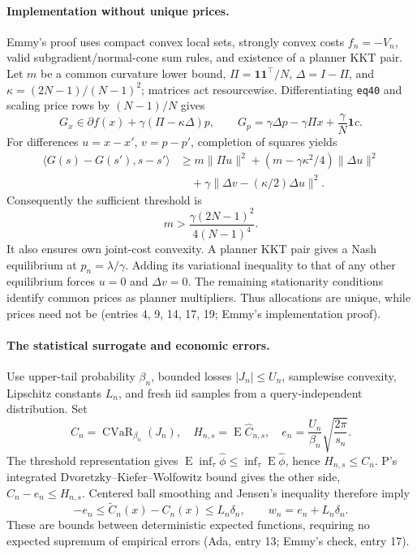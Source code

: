 \documentclass{article}
\begin{document}
\paragraph{Implementation without unique prices.}
Emmy's proof uses compact convex local sets, strongly convex costs
\(f_n=-V_n\), valid subgradient/normal-cone sum rules, and existence of a
planner KKT pair. Let \(m\) be a common curvature lower bound,
\(\Pi=\mathbf1\mathbf1^\top/N\), \(\Delta=I-\Pi\), and
\(\kappa=(2N-1)/(N-1)^2\); matrices act resourcewise.
Differentiating \texttt{eq40} and scaling price rows by \((N-1)/N\) gives
\[
 G_x\in\partial f(x)+\gamma(\Pi-\kappa\Delta)p,
 \qquad G_p=\gamma\Delta p-\gamma\Pi x+\frac{\gamma}{N}\mathbf1c.
\]
For differences \(u=x-x'\), \(v=p-p'\), completion of squares yields
\begin{align*}
 \langle G(s)-G(s'),s-s'\rangle
 &\ge m\|\Pi u\|^2
 +(m-\gamma\kappa^2/4)\|\Delta u\|^2\\
 &\quad+\gamma\|\Delta v-(\kappa/2)\Delta u\|^2.
\end{align*}
Consequently the sufficient threshold is
\[
 m>\frac{\gamma(2N-1)^2}{4(N-1)^4}.
\]
It also ensures own joint-cost convexity. A planner KKT pair gives a Nash
equilibrium at \(p_n=\lambda/\gamma\). Adding its variational inequality
to that of any other equilibrium forces \(u=0\) and \(\Delta v=0\).
The remaining stationarity conditions identify common prices as planner
multipliers. Thus allocations are unique, while prices need not be
(entries 4, 9, 14, 17, 19; Emmy's implementation proof).

\paragraph{The statistical surrogate and economic errors.}
Use upper-tail probability \(\beta_n\), bounded losses \(|J_n|\le U_n\),
samplewise convexity, Lipschitz constants \(L_n\), and fresh iid samples
from a query-independent distribution. Set
\[
 C_n=\operatorname{CVaR}_{\beta_n}(J_n),\quad
 H_{n,s}=\operatorname{E}\widehat C_{n,s},\quad
 e_n=\frac{U_n}{\beta_n}\sqrt{\frac{2\pi}{s_n}}.
\]
The threshold representation gives
\(\operatorname{E}\inf_\tau\widehat\phi\le
\inf_\tau\operatorname{E}\widehat\phi\), hence \(H_{n,s}\le C_n\).
P's integrated Dvoretzky--Kiefer--Wolfowitz bound gives the other side,
\(C_n-e_n\le H_{n,s}\). Centered ball smoothing and Jensen's inequality
therefore imply
\[
 -e_n\le\widetilde C_n(x)-C_n(x)\le L_n\delta_n,
 \qquad w_n=e_n+L_n\delta_n.
\]
These are bounds between deterministic expected functions, requiring no
expected supremum of empirical errors (Ada, entry 13; Emmy's check, entry 17).
\end{document}
